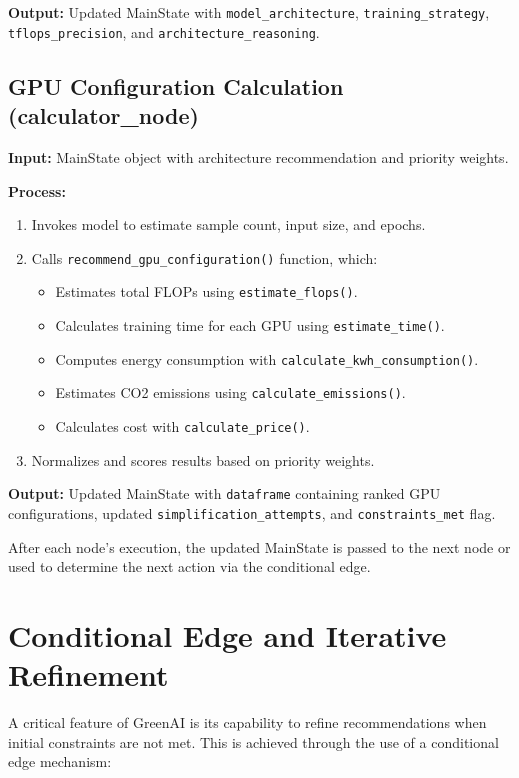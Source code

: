 \documentclass{report}
\begin{document}
\textbf{Output:} Updated MainState with \texttt{model\_architecture}, \texttt{training\_strategy}, \texttt{tflops\_precision}, and \texttt{architecture\_reasoning}.

\subsection{GPU Configuration Calculation (calculator\_node)}
\textbf{Input:} MainState object with architecture recommendation and priority weights.

\vspace{0.2cm}

\textbf{Process:}
\begin{enumerate}
    \item Invokes model to estimate sample count, input size, and epochs.
    \item Calls \texttt{recommend\_gpu\_configuration()} function, which:
    \begin{itemize}
        \item Estimates total FLOPs using \texttt{estimate\_flops()}.
        \item Calculates training time for each GPU using \texttt{estimate\_time()}.
        \item Computes energy consumption with \texttt{calculate\_kwh\_consumption()}.
        \item Estimates CO2 emissions using \texttt{calculate\_emissions()}.
        \item Calculates cost with \texttt{calculate\_price()}.
    \end{itemize}
    \item Normalizes and scores results based on priority weights.
\end{enumerate}

\textbf{Output:} Updated MainState with \texttt{dataframe} containing ranked GPU configurations, updated \texttt{simplification\_attempts}, and \texttt{constraints\_met} flag.

After each node's execution, the updated MainState is passed to the next node or used to determine the next action via the conditional edge.
\section{Conditional Edge and Iterative Refinement}

A critical feature of GreenAI is its capability to refine recommendations when initial constraints are not met. This is achieved through the use of a conditional edge mechanism:
\end{document}
